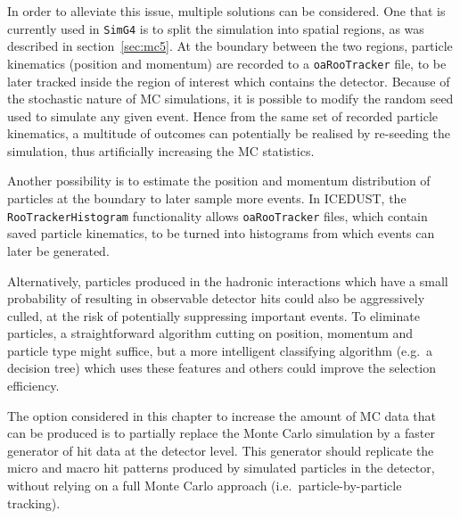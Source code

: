 

In order to alleviate this issue, multiple solutions can be considered. One that is currently used in \texttt{SimG4} is to split the simulation into spatial regions, as was described in section~\ref{sec:mc5}. At the boundary between the two regions, particle kinematics (position and momentum) are recorded to a \texttt{oaRooTracker} file, to be later tracked inside the region of interest which contains the detector. Because of the stochastic nature of MC simulations, it is possible to modify the random seed used to simulate any given event. Hence from the same set of recorded particle kinematics, a multitude of outcomes can potentially be realised by re-seeding the simulation, thus artificially increasing the MC statistics.

Another possibility is to estimate the position and momentum distribution of particles at the boundary to later sample more events. In ICEDUST, the \texttt{RooTrackerHistogram} functionality allows \texttt{oaRooTracker} files, which contain saved particle kinematics, to be turned into histograms from which events can later be generated.

Alternatively, particles produced in the hadronic interactions which have a small probability of resulting in observable detector hits could also be aggressively culled, at the risk of potentially suppressing important events. To eliminate particles, a straightforward algorithm cutting on position, momentum and particle type might suffice, but a more intelligent classifying algorithm (e.g.\ a decision tree) which uses these features and others could improve the selection efficiency. 

The option considered in this chapter to increase the amount of MC data that can be produced is to partially replace the Monte Carlo simulation by a faster generator of hit data at the detector level. This generator should replicate the micro and macro hit patterns produced by simulated particles in the detector, without relying on a full Monte Carlo approach (i.e.\ particle-by-particle tracking).

